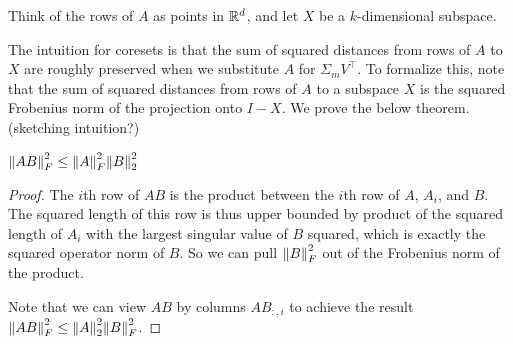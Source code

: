 \documentclass{article}
\begin{document}
Think of the rows of $A$ as points in $\R^d $, and let $X$ be a $k$-dimensional subspace. 

\begin{center}
\end{center}

The intuition for coresets is that the sum of squared distances from rows of $A$ to $X$ are roughly preserved when we substitute $A$ for $\Sigma _m V^{\top} $. To formalize this, note that the sum of squared distances from rows of $A$ to a subspace $X$ is the squared Frobenius norm of the projection onto $I - X$. We prove the below theorem. (sketching intuition?)

\begin{lemma}
    $\norm*{AB}_{F}^2   \leq \norm*{A}_{F}^2  \norm*{B}_2^2   $
\end{lemma}
\begin{proof}
    The $i$th row of $AB$ is the product between the $i$th row of $A$, $A_i $, and $B$. The squared length of this row is thus upper bounded by product of the squared length of $A_i $ with the largest singular value of $B$ squared, which is exactly the squared operator norm of $B$. So we can pull $\norm*{B}_{F} ^2 $ out of the Frobenius norm of the product. 

    Note that we can view $AB$ by columns $AB_{:, i} $ to achieve the result $\norm*{AB}_{F} ^2 \leq \norm*{A}_{2}^2  \norm*{B}_{F} ^2$. 
\end{proof}
\end{document}
